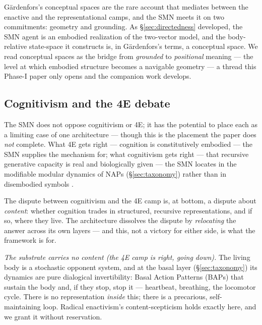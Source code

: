 \documentclass{article}
\begin{document}
G\"ardenfors's conceptual spaces
\citep{Gardenfors2020Events,Gardenfors2019Robot} are the rare account
that mediates between the enactive and the representational camps, and
the SMN meets it on two commitments: geometry and grounding.  As
\S\ref{sec:directedness} developed, the SMN agent is an embodied
realization of the two-vector model, and the body-relative state-space it
constructs is, in G\"ardenfors's terms, a conceptual space.  We read
conceptual spaces as the bridge from \emph{grounded} to \emph{positional}
meaning --- the level at which embodied structure becomes a navigable
geometry --- a thread this Phase-I paper only opens and the companion work
develops.

\subsection{Cognitivism and the 4E debate}\label{sec:rel-cognitivism}

The SMN does not oppose cognitivism or 4E; it has the potential to place
each as a limiting case of one architecture --- though this is the
placement the paper does \emph{not} complete.  What 4E gets right ---
cognition is constitutively embodied --- the SMN supplies the mechanism
for; what cognitivism gets right --- that recursive generative capacity is
real and biologically given --- the SMN locates in the modifiable modular
dynamics of NAPs (\S\ref{sec:taxonomy}) rather than in disembodied
symbols \citep{Chomsky1957SyntacticStructures}.

The dispute between cognitivism and the 4E camp is, at bottom, a dispute about
\emph{content}: whether cognition trades in structured, recursive
representations, and if so, where they live.  The architecture dissolves the
dispute by \emph{relocating} the answer across its own layers --- and this, not
a victory for either side, is what the framework is for.

\emph{The substrate carries no content (the 4E camp is right, going down).}  The
living body is a stochastic opponent system, and at the basal layer
(\S\ref{sec:taxonomy}) its dynamics are pure dialogical invertibility: Basal
Action Patterns (BAPs) that sustain the body and, if they stop, stop it ---
heartbeat, breathing, the locomotor cycle.  There is no representation
\emph{inside} this; there is a precarious, self-maintaining loop.  Radical
enactivism's content-scepticism holds exactly here, and we grant it without
reservation.
\end{document}
